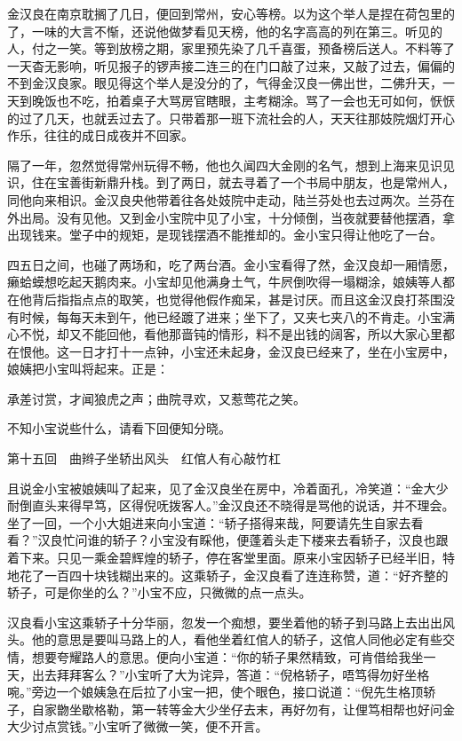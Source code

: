 \documentclass[12pt,UTF8]{ctexbook}
\begin{document}
{{{金汉良在南京耽搁了几日，便回到常州，安心等榜。以为这个举人是捏在荷包里的了，一味的大言不惭，还说他做梦看见天榜，他的名字高高的列在第三。听见的人，付之一笑。等到放榜之期，家里预先染了几千喜蛋，预备榜后送人。不料等了一天杳无影响，听见报子的锣声接二连三的在门口敲了过来，又敲了过去，偏偏的不到金汉良家。眼见得这个举人是没分的了，气得金汉良一佛出世，二佛升天，一天到晚饭也不吃，拍着桌子大骂房官瞎眼，主考糊涂。骂了一会也无可如何，恹恹的过了几天，也就丢过去了。只带着那一班下流社会的人，天天往那妓院烟灯开心作乐，往往的成日成夜并不回家。

隔了一年，忽然觉得常州玩得不畅，他也久闻四大金刚的名气，想到上海来见识见识，住在宝善街新鼎升栈。到了两日，就去寻着了一个书局中朋友，也是常州人，同他向来相识。金汉良央他带着往各处妓院中走动，陆兰芬处也去过两次。兰芬在外出局。没有见他。又到金小宝院中见了小宝，十分倾倒，当夜就要替他摆酒，拿出现钱来。堂子中的规矩，是现钱摆酒不能推却的。金小宝只得让他吃了一台。

四五日之间，也碰了两场和，吃了两台酒。金小宝看得了然，金汉良却一厢情愿，癞蛤蟆想吃起天鹅肉来。小宝却见他满身土气，牛屄倒吹得一塌糊涂，娘姨等人都在他背后指指点点的取笑，也觉得他假作痴呆，甚是讨厌。而且这金汉良打茶围没有时候，每每天未到午，他已经踱了进来；坐下了，又夹七夹八的不肯走。小宝满心不悦，却又不能回他，看他那啬钝的情形，料不是出钱的阔客，所以大家心里都在恨他。这一日才打十一点钟，小宝还未起身，金汉良已经来了，坐在小宝房中，娘姨把小宝叫将起来。正是：

承差讨赏，才闻狼虎之声；曲院寻欢，又惹莺花之笑。

不知小宝说些什么，请看下回便知分晓。





第十五回　曲辫子坐轿出风头　红倌人有心敲竹杠





且说金小宝被娘姨叫了起来，见了金汉良坐在房中，冷着面孔，冷笑道：“金大少耐倒直头来得早笃，区得倪呒拨客人。”金汉良还不晓得是骂他的说话，并不理会。坐了一回，一个小大姐进来向小宝道：“轿子搭得来哉，阿要请先生自家去看看？”汉良忙问谁的轿子？小宝没有睬他，便蓬着头走下楼来去看轿子，汉良也跟着下来。只见一乘金碧辉煌的轿子，停在客堂里面。原来小宝因轿子已经半旧，特地花了一百四十块钱糊出来的。这乘轿子，金汉良看了连连称赞，道：“好齐整的轿子，可是你坐的么？”小宝不应，只微微的点一点头。

汉良看小宝这乘轿子十分华丽，忽发一个痴想，要坐着他的轿子到马路上去出出风头。他的意思是要叫马路上的人，看他坐着红倌人的轿子，这倌人同他必定有些交情，想要夸耀路人的意思。便向小宝道：“你的轿子果然精致，可肯借给我坐一天，出去拜拜客么？”小宝听了大为诧异，答道：“倪格轿子，唔笃得勿好坐格啘。”旁边一个娘姨急在后拉了小宝一把，使个眼色，接口说道：“倪先生格顶轿子，自家朆坐歇格勒，第一转等金大少坐仔去末，再好勿有，让俚笃相帮也好问金大少讨点赏钱。”小宝听了微微一笑，便不开言。

}}}
\end{document}
